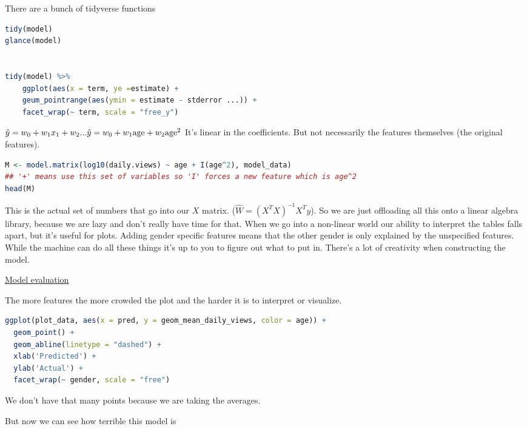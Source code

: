 There are a bunch of tidyverse functions

\begin{lstlisting}[language=R]
tidy(model)
glance(model)


tidy(model) %>%
    ggplot(aes(x = term, ye =estimate) +
    geum_pointrange(aes(ymin = estimate - stderror ...)) +
    facet_wrap(~ term, scale = "free_y")
\end{lstlisting}

$\hat{y} = w_0 + w_1x_1 + w_2 ...\\
\hat{y} = w_0 + w_1 \text{age} + w_2 \text{age}^2$
It's linear in the coefficients. But not necessarily the features themselves (the original features).
\begin{lstlisting}[language=R]
M <- model.matrix(log10(daily.views) ~ age + I(age^2), model_data)
## '+' means use this set of variables so 'I' forces a new feature which is age^2
head(M)
\end{lstlisting}
This is the actual set of numbers that go into our $X$ matrix. ($\hat{W} = (X^TX)^{-1} X^T y$). So we are just offloading all this onto a linear algebra library, because we are lazy and don't really have time for that. 
When we go into a non-linear world our ability to interpret the tables falls apart, but it's useful for plots.
Adding gender specific features means that the other gender is only explained by the unspecified features.
While the machine can do all these things it's up to you to figure out what to put in. There's a lot of creativity when constructing the model.

\vspace{0.3cm}

\href{https://github.com/jhofman/msd2019/blob/master/lectures/lecture_8/model_evaluation.ipynb}{Model evaluation} 

The more features the more crowded the plot and the harder it is to interpret or visualize.

\begin{lstlisting}[language=R]
ggplot(plot_data, aes(x = pred, y = geom_mean_daily_views, color = age)) +
  geom_point() +
  geom_abline(linetype = "dashed") +
  xlab('Predicted') +
  ylab('Actual') +
  facet_wrap(~ gender, scale = "free")
\end{lstlisting}
We don't have that many points because we are taking the averages.

But now we can see how terrible this model is

